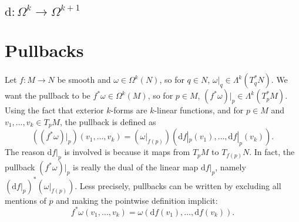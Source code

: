 \documentclass[10pt]{article}
\newcommand{\de}{\mathrm{d}}
\begin{document}
	\subsection*{$\de : \Omega^k \to \Omega^{k+1}$}

	\section*{Pullbacks}
	Let $f : M \to N$ be smooth and $\omega \in \Omega^k(N)$, so for $q \in N$, $\omega|_q \in \Lambda^k(T_q^* N)$. We want the pullback to be $f^* \omega \in \Omega^k(M)$, so for $p \in M$, $(f^* \omega)|_p \in \Lambda^k(T_p^* M)$. Using the fact that exterior $k$-forms are $k$-linear functions, and for $p \in M$ and $v_1, \ldots, v_k \in T_p M$, the pullback is defined as
	\[ ((f^* \omega)|_p)(v_1, \ldots, v_k) = (\omega|_{f(p)})(\de f|_p(v_1), \ldots, \de f|_p(v_k)). \]
	The reason $\de f|_p$ is involved is because it maps from $T_p M$ to $T_{f(p)} N$. In fact, the pullback $(f^* \omega)|_p$ is really the dual of the linear map $\de f|_p$, namely $(\de f|_p)^* (\omega|_{f(p)})$. Less precisely, pullbacks can be written by excluding all mentions of $p$ and making the pointwise definition implicit:
	\[ f^* \omega(v_1, \ldots, v_k) = \omega(\de f(v_1), \ldots, \de f(v_k)). \]
\end{document}
